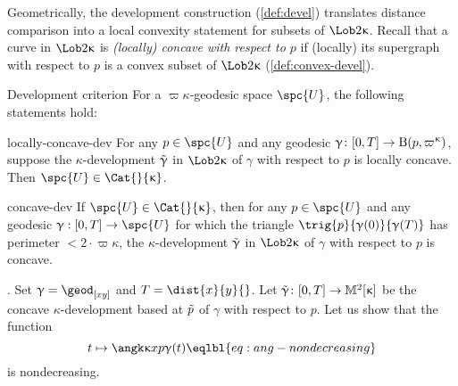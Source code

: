 Geometrically,   the development construction (\ref{def:devel}) translates distance comparison into a local convexity statement for subsets of $\Lob2\kappa$.  Recall that a curve in $\Lob2\kappa$ is \emph{(locally) concave with respect to $p$} if (locally) its supergraph with respect to $p$ is a convex subset of $\Lob2\kappa$ (\ref{def:convex-devel}).



\begin{thm}{Development criterion}\label{thm:concave-devel} 
For a $\varpi\kappa$-geodesic space $\spc{U}$,  the following statements hold:

\begin{subthm}{locally-concave-dev}
For any $p\in \spc{U}$ and any geodesic $\gamma\:[0,T]\to\oBall(p,\varpi\kappa)$, suppose the $\kappa$-development $\~\gamma$ in $\Lob2\kappa$ of $\gamma$ with respect to $p$ is locally concave. Then $\spc{U}\in\Cat{}{\kappa}$.
\end{subthm}

\begin{subthm}{concave-dev} 
If $\spc{U}\in\Cat{}{\kappa}$, then for any $p\in \spc{U}$ and any geodesic $\gamma:[0,T]\to\spc{U}$ 
for which the triangle $\trig{p}{\gamma(0)}{\gamma(T)}$ has perimeter $<2\cdot\varpi\kappa$,
the $\kappa$-development $\~\gamma$ in $\Lob2\kappa$ of $\gamma$ with respect to $p$ is concave. 
\end{subthm}

\end{thm}


.  
Set  $\gamma=\geod_{[x y]}$ and $T=\dist{x}{y}{}$. 
Let $\~\gamma\:[0,T]\to\Lob2\kappa$ be the concave $\kappa$-development based at $\~p$ of $\gamma$ with respect to $p$. 
Let us show that the function  
\[t\mapsto \angk\kappa x p{\gamma(t)}
\eqlbl{eq:ang-nondecreasing}\]   
is nondecreasing. 

